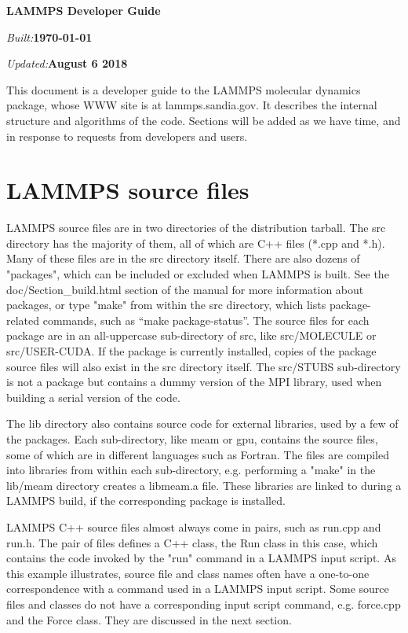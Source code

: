 \documentclass{article}
\begin{document}
\centerline{\Large \bf LAMMPS Developer Guide}
\centerline{\emph{Built:}\bf \today}
\centerline{\emph{Updated:}\bf August 6 2018}

\vspace{0.5in}

This document is a developer guide to the LAMMPS molecular dynamics
package, whose WWW site is at lammps.sandia.gov.  It describes the
internal structure and algorithms of the code.  Sections will be added
as we have time, and in response to requests from developers and
users.

\tableofcontents
\renewcommand\listoflistingscaption{List of source codes}
\listoflistings

\pagebreak
\section{LAMMPS source files}

LAMMPS source files are in two directories of the distribution
tarball.  The src directory has the majority of them, all of which are
C++ files (*.cpp and *.h).  Many of these files are in the src
directory itself.  There are also dozens of "packages", which can be
included or excluded when LAMMPS is built.  See the
doc/Section\_build.html section of the manual for more information
about packages, or type "make" from within the src directory, which
lists package-related commands, such as ``make package-status''.  The
source files for each package are in an all-uppercase sub-directory of
src, like src/MOLECULE or src/USER-CUDA.  If the package is currently
installed, copies of the package source files will also exist in the
src directory itself.  The src/STUBS sub-directory is not a package
but contains a dummy version of the MPI library, used when building a
serial version of the code.

The lib directory also contains source code for external libraries,
used by a few of the packages.  Each sub-directory, like meam or gpu,
contains the source files, some of which are in different languages
such as Fortran.  The files are compiled into libraries from within
each sub-directory, e.g. performing a "make" in the lib/meam directory
creates a libmeam.a file.  These libraries are linked to during a
LAMMPS build, if the corresponding package is installed.

LAMMPS C++ source files almost always come in pairs, such as run.cpp
and run.h.  The pair of files defines a C++ class, the Run class in
this case, which contains the code invoked by the "run" command in a
LAMMPS input script.  As this example illustrates, source file and
class names often have a one-to-one correspondence with a command used
in a LAMMPS input script.  Some source files and classes do not have a
corresponding input script command, e.g. force.cpp and the Force
class.  They are discussed in the next section.
\end{document}
